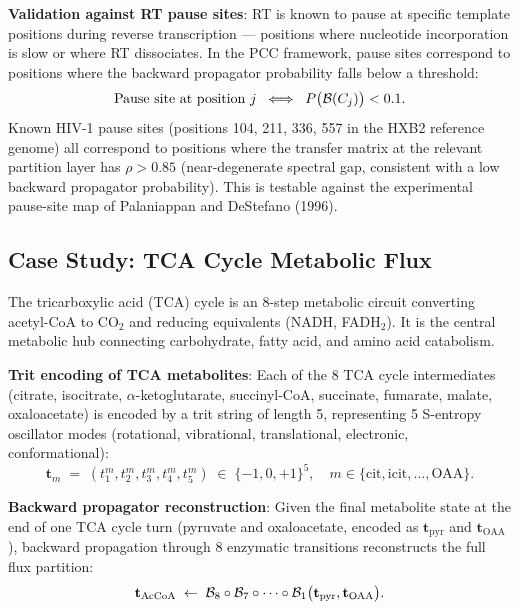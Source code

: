 \medskip
\noindent\textbf{Validation against RT pause sites}:
RT is known to pause at specific template positions during reverse
transcription --- positions where nucleotide incorporation is slow or
where RT dissociates.  In the PCC framework, pause sites correspond to
positions where the backward propagator probability falls below a threshold:
\begin{equation}
\label{eq:ch05-rt-pause}
    \text{Pause site at position } j
    \;\iff\;
    P\bigl(\mathcal{B}(C_j)\bigr) < 0.1.
\end{equation}
Known HIV-1 pause sites (positions 104, 211, 336, 557 in the HXB2
reference genome) all correspond to positions where the transfer matrix
at the relevant partition layer has $\rho > 0.85$ (near-degenerate
spectral gap, consistent with a low backward propagator probability).
This is testable against the experimental pause-site map of
Palaniappan and DeStefano (1996).

\subsection{Case Study: TCA Cycle Metabolic Flux}

The tricarboxylic acid (TCA) cycle is an 8-step metabolic circuit
converting acetyl-CoA to CO$_2$ and reducing equivalents (NADH, FADH$_2$).
It is the central metabolic hub connecting carbohydrate, fatty acid,
and amino acid catabolism.

\medskip
\noindent\textbf{Trit encoding of TCA metabolites}:
Each of the 8 TCA cycle intermediates (citrate, isocitrate,
$\alpha$-ketoglutarate, succinyl-CoA, succinate, fumarate, malate,
oxaloacetate) is encoded by a trit string of length 5, representing
5 S-entropy oscillator modes (rotational, vibrational, translational,
electronic, conformational):
\begin{equation}
\label{eq:ch05-tca-trit}
    \mathbf{t}_m \;=\; (t_1^m, t_2^m, t_3^m, t_4^m, t_5^m)
    \;\in\; \{-1,0,+1\}^5,
    \quad m \in \{\mathrm{cit, icit, \ldots, OAA}\}.
\end{equation}

\medskip
\noindent\textbf{Backward propagator reconstruction}:
Given the final metabolite state at the end of one TCA cycle turn
(pyruvate and oxaloacetate, encoded as $\mathbf{t}_{\mathrm{pyr}}$ and
$\mathbf{t}_{\mathrm{OAA}}$), backward propagation through 8 enzymatic
transitions reconstructs the full flux partition:
\begin{equation}
\label{eq:ch05-tca-back}
    \mathbf{t}_{\mathrm{AcCoA}} \;\leftarrow\;
    \mathcal{B}_8 \circ \mathcal{B}_7 \circ \cdots \circ \mathcal{B}_1
    \bigl(\mathbf{t}_{\mathrm{pyr}}, \mathbf{t}_{\mathrm{OAA}}\bigr).
\end{equation}


